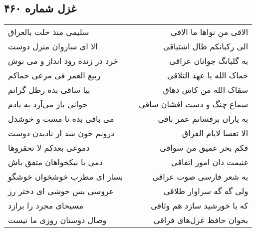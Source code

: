 \begin{center}
\section*{غزل شماره ۴۶۰}
\label{sec:sh460}
\begin{longtable}{l p{0.5cm} r}
سلیمی منذ حلت بالعراق
&&
الاقی من نواها ما الاقی
\\
الا ای ساروان منزل دوست
&&
الی رکبانکم طال اشتیاقی
\\
خرد در زنده رود انداز و می نوش
&&
به گلبانگ جوانان عراقی
\\
ربیع العمر فی مرعی حماکم
&&
حماک الله یا عهد التلاقی
\\
بیا ساقی بده رطل گرانم
&&
سقاک الله من کاس دهاق
\\
جوانی باز می‌آرد به یادم
&&
سماع چنگ و دست افشان ساقی
\\
می باقی بده تا مست و خوشدل
&&
به یاران برفشانم عمر باقی
\\
درونم خون شد از نادیدن دوست
&&
الا تعسا لایام الفراق
\\
دموعی بعدکم لا تحقروها
&&
فکم بحر عمیق من سواقی
\\
دمی با نیکخواهان متفق باش
&&
غنیمت دان امور اتفاقی
\\
بساز ای مطرب خوشخوان خوشگو
&&
به شعر فارسی صوت عراقی
\\
عروسی بس خوشی ای دختر رز
&&
ولی گه گه سزاوار طلاقی
\\
مسیحای مجرد را برازد
&&
که با خورشید سازد هم وثاقی
\\
وصال دوستان روزی ما نیست
&&
بخوان حافظ غزل‌های فراقی
\\
\end{longtable}
\end{center}
